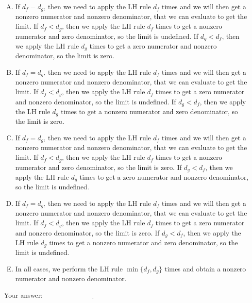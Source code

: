 \documentclass[10pt]{amsart}
\begin{document}
\begin{enumerate}
  \begin{enumerate}[(A)]
  \item If $d_f = d_g$, then we need to apply the LH rule $d_f$ times
    and we will then get a nonzero numerator and nonzero denominator,
    that we can evaluate to get the limit. If $d_f < d_g$, then we
    apply the LH rule $d_f$ times to get a nonzero numerator and zero
    denominator, so the limit is undefined. If $d_g < d_f$, then we
    apply the LH rule $d_g$ times to get a zero numerator and nonzero
    denominator, so the limit is zero.
  \item If $d_f = d_g$, then we need to apply the LH rule $d_f$ times
    and we will then get a nonzero numerator and nonzero denominator,
    that we can evaluate to get the limit. If $d_f < d_g$, then we
    apply the LH rule $d_f$ times to get a zero numerator and nonzero
    denominator, so the limit is undefined. If $d_g < d_f$, then we
    apply the LH rule $d_g$ times to get a nonzero numerator and zero
    denominator, so the limit is zero.
  \item If $d_f = d_g$, then we need to apply the LH rule $d_f$ times
    and we will then get a nonzero numerator and nonzero denominator,
    that we can evaluate to get the limit. If $d_f < d_g$, then we
    apply the LH rule $d_f$ times to get a nonzero numerator and zero
    denominator, so the limit is zero. If $d_g < d_f$, then we
    apply the LH rule $d_g$ times to get a zero numerator and nonzero
    denominator, so the limit is undefined.
  \item If $d_f = d_g$, then we need to apply the LH rule $d_f$ times
    and we will then get a nonzero numerator and nonzero denominator,
    that we can evaluate to get the limit. If $d_f < d_g$, then we
    apply the LH rule $d_f$ times to get a zero numerator and nonzero
    denominator, so the limit is zero. If $d_g < d_f$, then we
    apply the LH rule $d_g$ times to get a nonzero numerator and zero
    denominator, so the limit is undefined.
  \item In all cases, we perform the LH rule $\min \{ d_f, d_g \}$
    times and obtain a nonzero numerator and nonzero denominator.
  \end{enumerate}

  \vspace{0.1in}
  Your answer: $\underline{\qquad\qquad\qquad\qquad\qquad\qquad\qquad}$
  \vspace{0.15in}

\end{enumerate}
\end{document}
